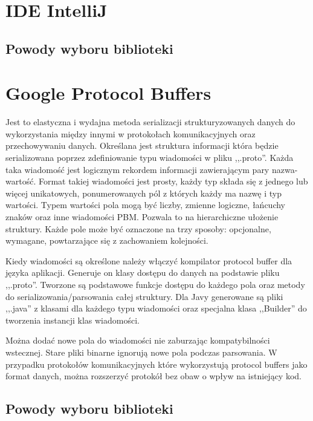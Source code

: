 \section[IDE IntelliJ]{IDE IntelliJ}

\subsection*[Powody wyboru biblioteki]{Powody wyboru biblioteki}

\section{Google Protocol Buffers} \label{protobuf}

\par{Jest to elastyczna i wydajna metoda serializacji strukturyzowanych danych do wykorzystania między innymi w protokołach komunikacyjnych oraz przechowywaniu danych. Określana jest struktura informacji która będzie serializowana poprzez zdefiniowanie typu wiadomości w pliku ,,.proto''. Każda taka wiadomość jest logicznym rekordem informacji zawierającym pary nazwa-wartość. Format takiej wiadomości jest prosty, każdy typ składa się z jednego lub więcej unikatowych, ponumerowanych pól z których każdy ma nazwę i typ wartości. Typem wartości pola mogą być liczby, zmienne logiczne, łańcuchy znaków oraz inne wiadomości PBM. Pozwala to na hierarchiczne ułożenie struktury. Każde pole może być oznaczone na trzy sposoby: opcjonalne, wymagane, powtarzające się z zachowaniem kolejności.}

\par{Kiedy wiadomości są określone należy włączyć kompilator protocol buffer dla języka aplikacji. Generuje on klasy dostępu do danych na podstawie pliku ,,.proto''. Tworzone są podstawowe funkcje dostępu do każdego pola oraz metody do serializowania/parsowania całej struktury. Dla Javy generowane są pliki ,,.java'' z klasami dla każdego typu wiadomości oraz specjalna klasa ,,Builder'' do tworzenia instancji klas wiadomości.}

\par{Można dodać nowe pola do wiadomości nie zaburzając kompatybilności wstecznej. Stare pliki binarne ignorują nowe pola podczas parsowania. W przypadku protokołów komunikacyjnych które wykorzystują protocol buffers jako format danych, można rozszerzyć protokół bez obaw o wpływ na istniejący kod.}

\subsection*[Powody wyboru biblioteki]{Powody wyboru biblioteki}

